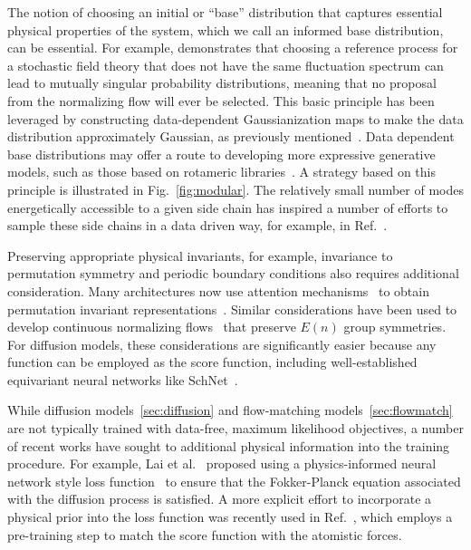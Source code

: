 \documentclass[11pt]{article}
\begin{document}
The notion of choosing an initial or ``base'' distribution that captures essential physical properties of the system, which we call an informed base distribution, can be essential. 
For example, \cite{gabrie_adaptive_2022} demonstrates that choosing a reference process for a stochastic field theory that does not have the same fluctuation spectrum can lead to mutually singular probability distributions, meaning that no proposal from the normalizing flow will ever be selected.
This basic principle has been leveraged by constructing data-dependent Gaussianization maps to make the data distribution approximately Gaussian, as previously mentioned~\cite{noe_boltzmann_2019}.
Data dependent base distributions may offer a route to developing more expressive generative models, such as those based on rotameric libraries~\cite{dunbrack_jr_bayesian_1997, dunbrack_rotamer_2002}.
A strategy based on this principle is illustrated in Fig.~\ref{fig:modular}.
The relatively small number of modes energetically accessible to a given side chain has inspired a number of efforts to sample these side chains in a data driven way, for example, in Ref.~\cite{jumper_rapid_2017}.

Preserving appropriate physical invariants, for example, invariance to permutation symmetry and periodic boundary conditions also requires additional consideration.
Many architectures now use attention mechanisms~\cite{vaswani_attention_2017} to obtain permutation invariant representations~\cite{wirnsberger_targeted_2020}.
Similar considerations have been used to develop continuous normalizing flows~\cite{satorras_en_2021-1} that preserve $E(n)$ group symmetries. 
For diffusion models, these considerations are significantly easier because any function can be employed as the score function, including well-established equivariant neural networks like SchNet~\cite{schutt_schnet_2018}. 

While diffusion models~\ref{sec:diffusion} and flow-matching models~\ref{sec:flowmatch} are not typically trained with data-free, maximum likelihood objectives, a number of recent works have sought to additional physical information into the training procedure.
For example, Lai et al.~\cite{lai_fp-diffusion_2023} proposed using a physics-informed neural network style loss function~\cite{karniadakis_physics-informed_2021} to ensure that the Fokker-Planck equation associated with the diffusion process is satisfied.
A more explicit effort to incorporate a physical prior into the loss function was recently used in Ref.~\cite{zheng_towards_2023}, which employs a pre-training step to match the score function with the atomistic forces.
\end{document}
